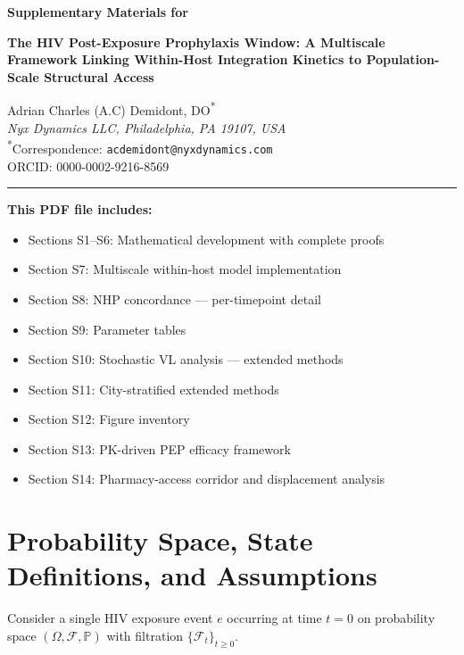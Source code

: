 \documentclass[11pt]{article}
\theoremstyle{definition}
\theoremstyle{remark}
\begin{document}
\begin{flushleft}
{\Large\bfseries Supplementary Materials for\par}
\vspace{0.3em}
{\large\bfseries The HIV Post-Exposure Prophylaxis Window:
A Multiscale Framework Linking Within-Host Integration Kinetics to Population-Scale Structural Access\par}
\vspace{0.8em}
Adrian Charles (A.C) Demidont, DO\textsuperscript{*}\\
\textit{Nyx Dynamics LLC, Philadelphia, PA 19107, USA}\\
\textsuperscript{*}Correspondence: \texttt{acdemidont@nyxdynamics.com}\\
ORCID: 0000-0002-9216-8569
\end{flushleft}

\vspace{0.5em}
\hrule
\vspace{0.5em}

\noindent\textbf{This PDF file includes:}
\begin{itemize}[leftmargin=2em,nosep]
\item Sections S1--S6: Mathematical development with complete proofs
\item Section S7: Multiscale within-host model implementation
\item Section S8: NHP concordance --- per-timepoint detail
\item Section S9: Parameter tables
\item Section S10: Stochastic VL analysis --- extended methods
\item Section S11: City-stratified extended methods
\item Section S12: Figure inventory
\item Section S13: PK-driven PEP efficacy framework
\item Section S14: Pharmacy-access corridor and displacement analysis
\end{itemize}

\vspace{0.5em}



\section{Probability Space, State Definitions, and Assumptions}

Consider a single HIV exposure event $e$ occurring at time $t = 0$ on probability space $(\Omega, \mathcal{F}, \mathbb{P})$ with filtration $\{\mathcal{F}_{t}\}_{t \geq 0}$.
\end{document}
